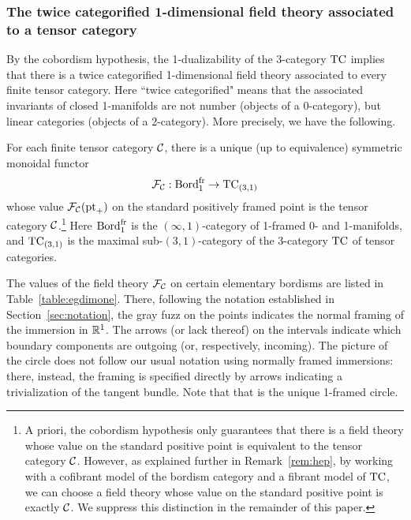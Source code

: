 \documentclass{amsart}
\begin{document}
\subsubsection{The twice categorified 1-dimensional field theory associated to a tensor category}

By the cobordism hypothesis, the 1-dualizability of the 3-category $\mathrm{TC}$ implies that there is a twice categorified 1-dimensional field theory associated to every finite tensor category.  Here ``twice categorified" means that the associated invariants of closed 1-manifolds are not number (objects of a 0-category), but linear categories (objects of a 2-category).  More precisely, we have the following.
\begin{corollary}
For each finite tensor category $\mathcal C$, there is a unique (up to equivalence) symmetric monoidal functor
\[
\mathcal F_\mathcal C: \mathrm{Bord}^\mathrm{fr}_1 \rightarrow \mathrm{TC}_{(3,1)}
\]
whose value $\mathcal F_\mathcal C(\mathrm{pt}_+)$ on the standard positively framed point is the tensor category $\mathcal C$.\footnote{A priori, the cobordism hypothesis only guarantees that there is a field theory whose value on the standard positive point is equivalent to the tensor category $\mathcal C$.  However, as explained further in Remark~\ref{rem:hep}, by working with a cofibrant model of the bordism category and a fibrant model of $\mathrm{TC}$, we can choose a field theory whose value on the standard positive point is exactly $\mathcal C$.  We suppress this distinction in the remainder of this paper.\label{ftn:exactly}}  Here $\mathrm{Bord}^\mathrm{fr}_1$ is the $(\infty,1)$-category of 1-framed 0- and 1-manifolds, and $\mathrm{TC}_{(3,1)}$ is the maximal sub-$(3,1)$-category of the 3-category $\mathrm{TC}$ of tensor categories.
\end{corollary}

The values of the field theory $\mathcal F_\mathcal C$ on certain elementary bordisms are listed in Table~\ref{table:egdimone}.  There, following the notation established in Section~\ref{sec:notation}, the gray fuzz on the points indicates the normal framing of the immersion in $\mathbb R^1$.  The arrows (or lack thereof) on the intervals indicate which boundary components are outgoing (or, respectively, incoming).  The picture of the circle does not follow our usual notation using normally framed immersions: there, instead, the framing is specified directly by arrows indicating a trivialization of the tangent bundle.  Note that that is the unique 1-framed circle.
\end{document}
